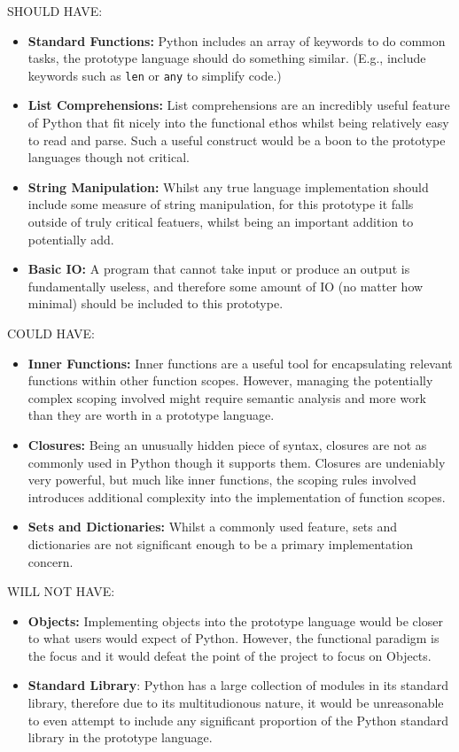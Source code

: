 \documentclass{l4proj}
\begin{document}
SHOULD HAVE:
\begin{itemize}
    \item \textbf{Standard Functions:} Python includes an array of keywords to do common tasks, the prototype language should do something similar.
    (E.g., include keywords such as \verb|len| or \verb|any| to simplify code.)
    \item \textbf{List Comprehensions:} List comprehensions are an incredibly useful feature of Python that fit nicely into the functional ethos whilst being relatively easy to read and parse.
    Such a useful construct would be a boon to the prototype languages though not critical.
    \item \textbf{String Manipulation:} Whilst any true language implementation should include some measure of string manipulation, for this prototype it falls outside of truly critical featuers, whilst being an important addition to potentially add.
    \item \textbf{Basic IO:} A program that cannot take input or produce an output is fundamentally useless, and therefore some amount of IO (no matter how minimal) should be included to this prototype.
\end{itemize}

COULD HAVE:
\begin{itemize}
    \item \textbf{Inner Functions:} Inner functions are a useful tool for encapsulating relevant functions within other function scopes.
    However, managing the potentially complex scoping involved might require semantic analysis and more work than they are worth in a prototype language.
    \item \textbf{Closures:} Being an unusually hidden piece of syntax, closures are not as commonly used in Python though it supports them.
    Closures are undeniably very powerful, but much like inner functions, the scoping rules involved introduces additional complexity into the implementation of function scopes. 
    \item \textbf{Sets and Dictionaries:} Whilst a commonly used feature, sets and dictionaries are not significant enough to be a primary implementation concern.
\end{itemize}

WILL NOT HAVE:
\begin{itemize}
    \item \textbf{Objects:} Implementing objects into the prototype language would be closer to what users would expect of Python. However, the functional paradigm is the focus and it would defeat the point of the project to focus on Objects.
    \item \textbf{Standard Library}: Python has a large collection of modules in its standard library, therefore due to its multitudionous nature, it would be unreasonable to even attempt to include any significant proportion of the Python standard library in the prototype language. 
\end{itemize}
\end{document}
